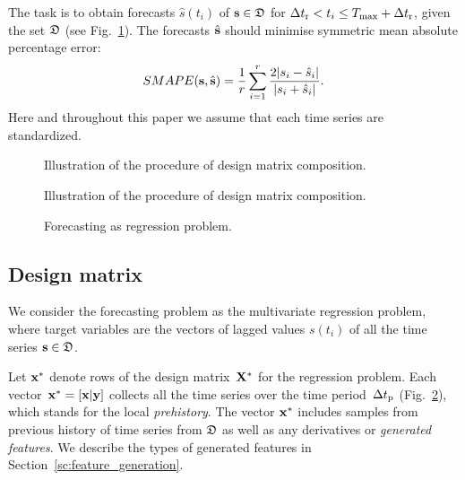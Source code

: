 \documentclass[conference]{IEEEtran}
\begin{document}
 The task is to obtain forecasts $\hat{s}(t_i)$ of ${\mathbf{s}} \in {\mathfrak{D}}$ for  $\Delta t_\text{r} <  t_i \leq T_{\max} + \Delta t_\text{r}$, given the set  ${\mathfrak{D}}$ (see Fig.~\ref{fg:online_frc}). The forecasts $\hat{{\mathbf{s}}}$ should minimise symmetric mean absolute percentage error:
 \begin{equation}\label{eq:MAPE}
 SMAPE(\bs, \hat{\bs}) = \frac{1}{r}\sum_{i = 1}^{r} \frac{2|s_i - \hat{s}_i|}{|s_i + \hat{s}_i|}. \end{equation}
 Here and throughout this paper we assume that each time series are standardized.


\begin{figure}[!ht]
\def\svgwidth{0.4\textwidth}
\centering

\caption{Illustration of the procedure of design matrix composition.}\label{fg:online_frc}
\end{figure}


\begin{figure}[!ht]
\def\svgwidth{0.4\textwidth}
\centering

\caption{Illustration of the procedure of design matrix composition.}\label{fg:draw}
\end{figure}


\begin{figure}
\def\svgwidth{0.4\textwidth}
\centering \subfloat[]
{
\label{fg:forecasting}
}
\caption{Forecasting as regression problem.}
\end{figure}




\subsection{Design matrix}

 We consider the forecasting problem as the multivariate regression problem, where target variables are the vectors of lagged values $s(t_i)$ of all the time series ${\mathbf{s}} \in {\mathfrak{D}}$.

Let ${\mathbf{x}}^{*}$ denote rows of the design matrix~${\mathbf{X}}^*$ for the regression problem. Each vector~${\mathbf{x}}^{*} = [{\mathbf{x}}| {\mathbf{y}}]$ collects all the time series over the time period~$\Delta t_\text{p}$ (Fig.~\ref{fg:draw}), which stands for the local \emph{prehistory}. The vector ${\mathbf{x}}^{*}$ includes samples from previous history of time series from ${\mathfrak{D}}$ as well as any derivatives or \emph{generated features}. We describe the types of generated features in Section~\ref{sc:feature_generation}.
\end{document}
